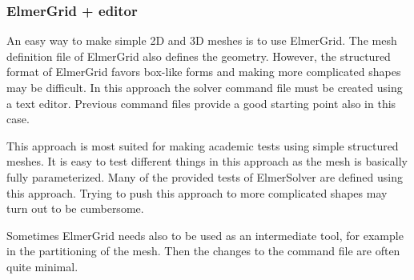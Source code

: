\subsubsection*{ElmerGrid + editor}

An easy way to make simple 2D and 3D meshes is to use ElmerGrid. The mesh definition file 
of ElmerGrid also defines the geometry. However, the structured format of ElmerGrid favors
box-like forms and making more complicated shapes may be difficult. 
In this approach 
the solver command file must be created using a text editor. Previous command files provide a good 
starting point also in this case. 

This approach is most suited for making academic tests using simple structured meshes. 
It is easy to test different things in this approach as the mesh is basically fully parameterized. 
Many of the provided tests of ElmerSolver are defined using this approach. 
Trying to push this approach to more complicated shapes may turn out to be cumbersome. 
 
Sometimes ElmerGrid needs also to be used as an intermediate tool, for example in the partitioning of the mesh.
Then the changes to the command file are often quite minimal. 










